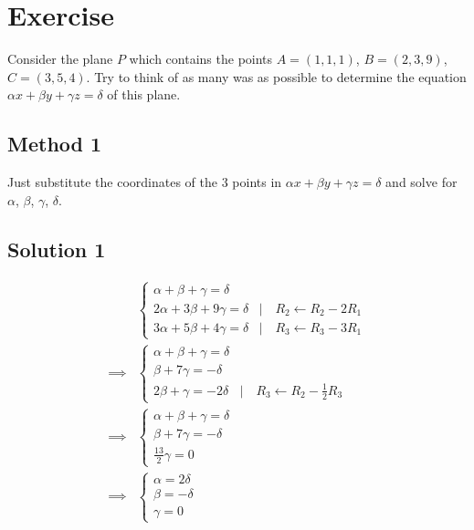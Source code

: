 \documentclass[a4paper,10pt]{article}
\begin{document}
\clearpage

\section{Exercise}

Consider the plane $P$ which contains the points $A = (1, 1, 1)$, $B = (2, 3, 9)$, $C = (3, 5, 4)$. Try to think of as many was as possible to determine the equation $\alpha x + \beta y + \gamma z = \delta$ of this plane.

\subsection{Method 1}
Just substitute the coordinates of the 3 points in $\alpha x + \beta y + \gamma z = \delta$ and solve for $\alpha$, $\beta$, $\gamma$, $\delta$.

\subsection{Solution 1}
\begin{align*}
     & \begin{cases}
           \alpha + \beta + \gamma = \delta                                        \\
           2\alpha + 3\beta + 9\gamma = \delta & |\quad R_2 \leftarrow R_2 - 2 R_1 \\
           3\alpha + 5\beta + 4\gamma = \delta & |\quad R_3 \leftarrow R_3 - 3 R_1
       \end{cases} \\ \implies &
    \begin{cases}
        \alpha + \beta + \gamma = \delta                                        \\
        \beta + 7\gamma = -\delta                                               \\
        2\beta + \gamma = -2\delta & |\quad R_3 \leftarrow R_2 - \frac{1}{2}R_3
    \end{cases}    \\ \implies &
    \begin{cases}
        \alpha + \beta + \gamma = \delta \\
        \beta + 7\gamma = -\delta        \\
        \frac{13}{2}\gamma = 0
    \end{cases}                                           \\ \implies &
    \begin{cases}
        \alpha = 2\delta \\
        \beta = -\delta  \\
        \gamma = 0
    \end{cases}
\end{align*}
\end{document}
